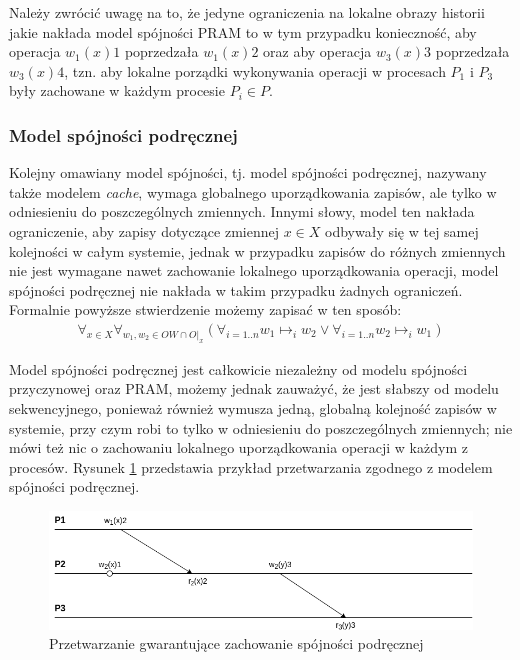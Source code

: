 Należy zwrócić uwagę na to, że jedyne ograniczenia na lokalne obrazy historii jakie nakłada model spójności PRAM to w tym przypadku konieczność, aby operacja $ w_1(x)1 $ poprzedzała $ w_1(x)2 $ oraz aby operacja $ w_3(x)3 $ poprzedzała $ w_3(x)4 $, tzn. aby lokalne porządki wykonywania operacji w procesach $ P_1 $ i $ P_3 $ były zachowane w każdym procesie $ P_i \in P $.

\subsubsection{Model spójności podręcznej}

Kolejny omawiany model spójności, tj. model spójności podręcznej, nazywany także modelem \textit{cache}, wymaga globalnego uporządkowania zapisów, ale tylko w odniesieniu do poszczególnych zmiennych. Innymi słowy, model ten nakłada ograniczenie, aby zapisy dotyczące zmiennej $ x \in X $ odbywały się w tej samej kolejności w całym systemie, jednak w przypadku zapisów do różnych zmiennych nie jest wymagane nawet zachowanie lokalnego uporządkowania operacji, model spójności podręcznej nie nakłada w takim przypadku żadnych ograniczeń. Formalnie powyższe stwierdzenie możemy zapisać w ten sposób:
\begin{align*}
    \forall_{x \in X} \forall_{w_1, w_2 \in OW \cap O|_x} (\forall_{i=1..n} w_1 \mapsto_i w_2 \vee \forall_{i=1..n} w_2 \mapsto_i w_1)
\end{align*}

Model spójności podręcznej jest całkowicie niezależny od modelu spójności przyczynowej oraz PRAM, możemy jednak zauważyć, że jest słabszy od modelu sekwencyjnego, ponieważ również wymusza jedną, globalną kolejność zapisów w systemie, przy czym robi to tylko w odniesieniu do poszczególnych zmiennych; nie mówi też nic o zachowaniu lokalnego uporządkowania operacji w każdym z procesów. Rysunek \ref{figure:replication_cache} przedstawia przykład przetwarzania zgodnego z modelem spójności podręcznej.

\begin{figure}
    \includegraphics[width=\linewidth]{images/02-cache.png}
    \caption{Przetwarzanie gwarantujące zachowanie spójności podręcznej}
    \label{figure:replication_cache}
\end{figure}

